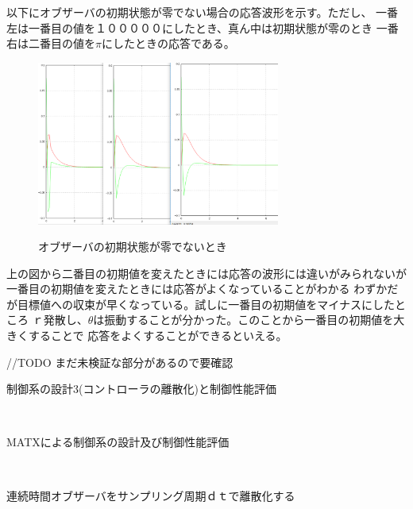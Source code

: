 \documentclass{jarticle}
\begin{document}
\begin{enumerate}
\begin{enumerate}
					以下にオブザーバの初期状態が零でない場合の応答波形を示す。ただし、
					一番左は一番目の値を１０００００にしたとき、真ん中は初期状態が零のとき
					一番右は二番目の値を$\pi$にしたときの応答である。
					\begin{figure}[htbp]
						\begin{center}
							\includegraphics[width=8cm]{gazo/ObserverNotZero.pdf}\\
						\end{center}
						\caption{オブザーバの初期状態が零でないとき}
					\end{figure}
					上の図から二番目の初期値を変えたときには応答の波形には違いがみられないが
					一番目の初期値を変えたときには応答がよくなっていることがわかる
					わずかだが目標値への収束が早くなっている。試しに一番目の初期値をマイナスにしたところ
					ｒ発散し、$\theta$は振動することが分かった。このことから一番目の初期値を大きくすることで
					応答をよくすることができるといえる。
					
					//TODO まだ未検証な部分があるので要確認
					
								
		\end{enumerate}
		{\LARGE\item 制御系の設計3(コントローラの離散化)と制御性能評価}\\
		\begin{enumerate}
			{\Large\item MATXによる制御系の設計及び制御性能評価}\\
			\begin{enumerate}
				{\large\item 連続時間オブザーバをサンプリング周期ｄｔで離散化する}\\
				

\end{enumerate}
\end{enumerate}
\end{enumerate}
\end{document}
